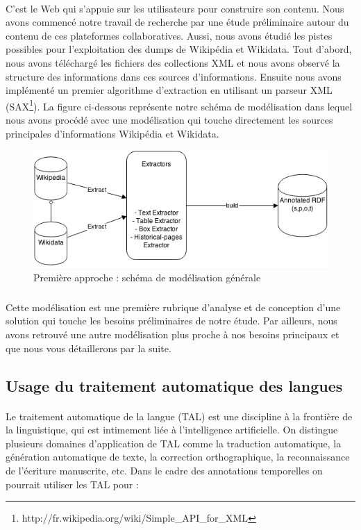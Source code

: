 \paragraph{}
C'est le Web qui s'appuie sur les utilisateurs pour construire son contenu. Nous avons commencé notre travail de recherche par une étude préliminaire autour du contenu de ces plateformes collaboratives. Aussi, nous avons étudié les pistes possibles pour l'exploitation des dumps de Wikipédia et Wikidata. Tout d'abord, nous avons téléchargé les fichiers des collections XML et nous avons observé la structure des informations dans ces sources d'informations. Ensuite nous avons implémenté un premier algorithme d'extraction en utilisant un parseur XML (SAX\footnote{http://fr.wikipedia.org/wiki/Simple\_API\_for\_XML}).
La figure ci-dessous représente notre schéma de modélisation dans lequel nous avons procédé avec une modélisation qui touche directement les sources principales d'informations Wikipédia et Wikidata.
\begin{figure}[H]
        \centering
                \centering
                \includegraphics[width=13cm]{modelisation.png}
               \caption{Première approche : schéma de modélisation générale}

\end{figure}
\subparagraph{}
Cette modélisation est une première rubrique d'analyse et de conception d'une solution qui touche les besoins préliminaires de notre étude. Par ailleurs, nous avons retrouvé une autre modélisation plus proche à nos besoins principaux et que nous vous détaillerons par la suite.
\subsection{Usage du traitement automatique des langues}
\paragraph{}
Le traitement automatique de la langue (TAL) est une discipline à la frontière de la linguistique, qui est intimement liée à l'intelligence artificielle.
On distingue plusieurs domaines d'application de TAL comme la traduction automatique, la génération automatique de texte, la correction orthographique, la reconnaissance de l'écriture manuscrite, etc.
Dans le cadre des annotations temporelles on pourrait utiliser les TAL pour :

